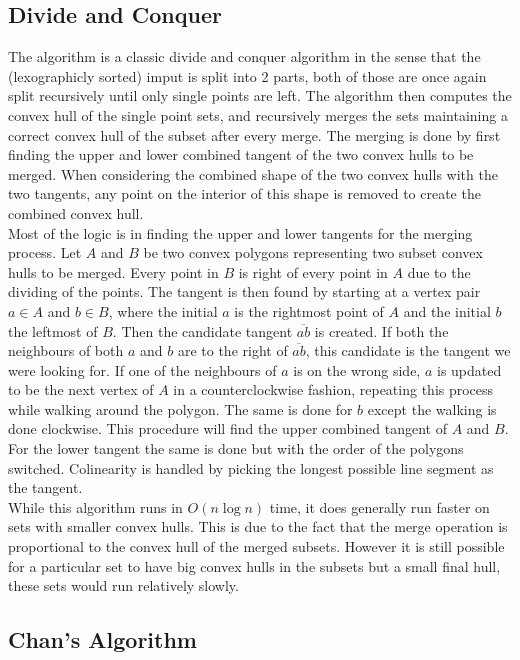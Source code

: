 \documentclass{article}
\begin{document}
\subsection*{Divide and Conquer}
The algorithm is a classic divide and conquer algorithm in the sense that the (lexographicly sorted) imput is split into 2 parts, both of those are once again split recursively until only single points are left.
The algorithm then computes the convex hull of the single point sets, and recursively merges the sets maintaining a correct convex hull of the subset after every merge.
The merging is done by first finding the upper and lower combined tangent of the two convex hulls to be merged.
When considering the combined shape of the two convex hulls with the two tangents, any point on the interior of this shape is removed to create the combined convex hull.
\\
Most of the logic is in finding the upper and lower tangents for the merging process.
Let $A$ and $B$ be two convex polygons representing two subset convex hulls to be merged. Every point in $B$ is right of every point in $A$ due to the dividing of the points.
The tangent is then found by starting at a vertex pair $a \in A$ and $b \in B$, where the initial $a$ is the rightmost point of $A$ and the initial $b$ the leftmost of $B$. 
Then the candidate tangent $\overline{ab}$ is created.
If both the neighbours of both $a$ and $b$ are to the right of $\overline{ab}$, this candidate is the tangent we were looking for. 
If one of the neighbours of $a$ is on the wrong side, $a$ is updated to be the next vertex of $A$ in a counterclockwise fashion, repeating this process while walking around the polygon. 
The same is done for $b$ except the walking is done clockwise.
This procedure will find the upper combined tangent of $A$ and $B$. For the lower tangent the same is done but with the order of the polygons switched.
Colinearity is handled by picking the longest possible line segment as the tangent.
\\
While this algorithm runs in $O(n\log n)$ time, it does generally run faster on sets with smaller convex hulls. 
This is due to the fact that the merge operation is proportional to the convex hull of the merged subsets.
However it is still possible for a particular set to have big convex hulls in the subsets but a small final hull, these sets would run relatively slowly.
\subsection*{Chan's Algorithm}
\end{document}
